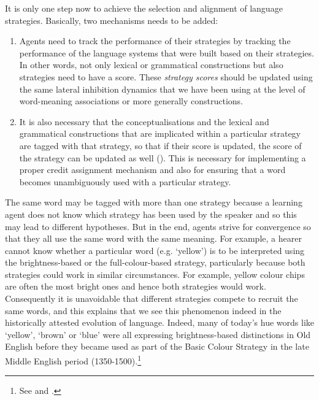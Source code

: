 It is only one step now to achieve the selection and alignment of language strategies. Basically, two mechanisms needs to be 
added: 
\begin{enumerate}
\item Agents need to track the performance of their strategies by tracking the performance of the language 
systems that were built based on their strategies. In other words, not only lexical or grammatical constructions
but also strategies need to have a score. These {\itshape strategy scores} should be updated using the same 
lateral inhibition dynamics that we have been using at the level of word-meaning associations or 
more generally constructions. 
\item It is also necessary that the conceptualisations and the lexical and grammatical constructions that 
are implicated within a particular strategy are tagged with that strategy, so that if their score is updated, 
the score of the strategy can be updated as well (). This is necessary  
for implementing a proper credit assignment 
mechanism and also for ensuring that a word becomes unambiguously used with a particular strategy. 
\end{enumerate}
The same word may be tagged with more than one strategy because 
a learning agent does not know which strategy has been used by the speaker and so this may lead to different
hypotheses. But in the end, agents strive for convergence so that they all use the 
same word with the same meaning. For example, a hearer cannot know whether a particular word (e.g. `yellow')
is to be interpreted using  the brightness-based or  the full-colour-based strategy, particularly
because both strategies could work in similar circumstances. For example, yellow colour chips are often the 
most bright ones and hence both strategies would work. Consequently it is unavoidable that different strategies compete
to recruit the same words, and this explains that we see this phenomenon indeed in the historically attested evolution 
of language. Indeed, many of today's hue words like `yellow', `brown' 
or `blue' were all expressing brightness-based distinctions in Old English before they became used as part of the  
Basic Colour Strategy in the late Middle English period (1350-1500).\footnote{See
\cite{MacLaury:1992} and \cite{Casson:1997}.}



